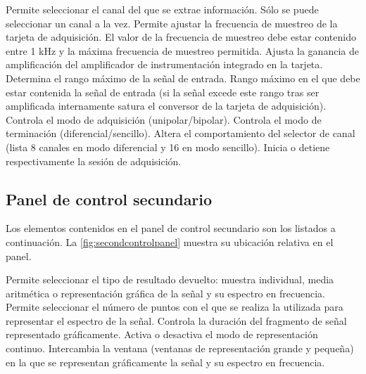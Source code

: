 \begin{enumerate}
     Permite seleccionar el canal del que se
	extrae información. Sólo se puede seleccionar un canal a la vez.
     Permite ajustar la frecuencia de
	muestreo de la tarjeta de adquisición. El valor de la frecuencia de
	muestreo debe estar contenido entre 1 kHz y la máxima frecuencia de
	muestreo permitida.
     Ajusta la ganancia de amplificación del
	amplificador de instrumentación integrado en la tarjeta. Determina
	el rango máximo de la señal de entrada.
     Rango máximo en el que debe estar contenida
	la señal de entrada (si la señal excede este rango tras ser
	amplificada internamente satura el conversor  de la
	tarjeta de adquisición).
     Controla el modo de adquisición
	(unipolar/bipolar).
     Controla el modo de terminación
	(diferencial/sencillo). Altera el comportamiento del selector de
	canal (lista 8 canales en modo diferencial y 16 en modo sencillo).
     Inicia o detiene respectivamente la sesión
	de adquisición.
\end{enumerate}


\subsection{Panel de control secundario}

Los elementos contenidos en el panel de control secundario son los listados
a continuación. La \cref{fig:secondcontrolpanel} muestra su ubicación
relativa en el panel.

\begin{enumerate}
     Permite seleccionar el tipo de
	resultado devuelto: muestra individual, media aritmética o
	representación gráfica de la señal y su espectro en frecuencia.
     Permite seleccionar el número de puntos con
	el que se realiza la  utilizada para representar el
	espectro de la señal.
     Controla la duración del fragmento de señal
	representado gráficamente. Activa o desactiva el modo de
	representación continuo.
     Intercambia la ventana (ventanas de
	representación grande y pequeña) en la que se representan
	gráficamente la señal y su espectro en frecuencia.
\end{enumerate}

\newlength{\biggestpanel}

